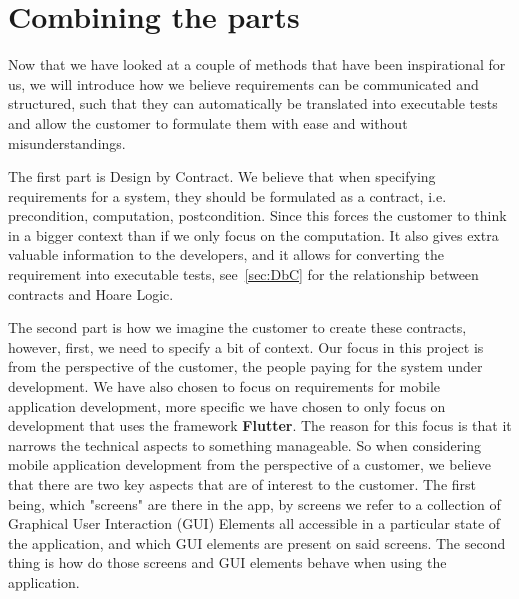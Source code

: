 \section{Combining the parts}
Now that we have looked at a couple of methods that have been inspirational for us, we will introduce how we believe requirements can be communicated and structured, such that they can automatically be translated into executable tests and allow the customer to formulate them with ease and without misunderstandings.

The first part is Design by Contract.
We believe that when specifying requirements for a system, they should be formulated as a contract, i.e. precondition, computation, postcondition. 
Since this forces the customer to think in a bigger context than if we only focus on the computation.
It also gives extra valuable information to the developers, and it allows for converting the requirement into executable tests, see~\autoref{sec:DbC} for the relationship between contracts and Hoare Logic.

The second part is how we imagine the customer to create these contracts, however, first, we need to specify a bit of context.
Our focus in this project is from the perspective of the customer, the people paying for the system under development.
We have also chosen to focus on requirements for mobile application development, more specific we have chosen to only focus on development that uses the framework \textbf{Flutter}.
The reason for this focus is that it narrows the technical aspects to something manageable.
So when considering mobile application development from the perspective of a customer, we believe that there are two key aspects that are of interest to the customer.
The first being, which "screens" are there in the app, by screens we refer to a collection of Graphical User Interaction (GUI) Elements all accessible in a particular state of the application, and which GUI elements are present on said screens.
The second thing is how do those screens and GUI elements behave when using the application.


